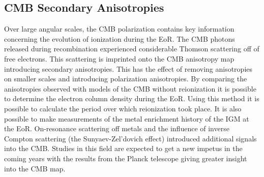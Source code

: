 
\subsection{CMB Secondary Anisotropies} %
\label{sub:cmb_secondary_anisotropies}
	Over large angular scales, the CMB polarization contains key information concerning the evolution of ionization during the EoR. The CMB photons released during recombination experienced considerable Thomson scattering off of free electrons. This scattering is imprinted onto the CMB anisotropy map introducing secondary anisotropies. This has the effect of removing anisotropies on smaller scales and introducing polarization anisotropies. By comparing the anisotropies observed with models of the CMB without reionization it is possible to determine the electron column density during the EoR. Using this method it is possible to calculate the period over which reionization took place. It is also possible to make measurements of the metal enrichment history of the IGM at the EoR. On-resonance scattering off metals and the influence of inverse Compton scattering (the Sunyaev-Zel'dovich effect) introduced additional signals into the CMB\cite{Monteagudo2006}. Studies in this field are expected to get a new impetus in the coming years with the results from the Planck telescope giving greater insight into the CMB map.
